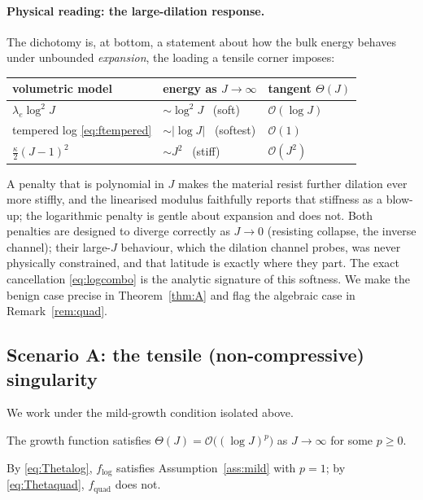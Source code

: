 \paragraph{Physical reading: the large-dilation response.}
The dichotomy is, at bottom, a statement about how the bulk energy behaves under unbounded \emph{expansion}, the
loading a tensile corner imposes:
\begin{center}
    \begin{tabular}{lll}
        \toprule
        volumetric model           & energy as $J\to\infty$   & tangent $\Theta(J)$   \\
        \midrule
        $\lambda_e\log^2 J$        & $\sim \log^2 J$ \ (soft) & $\mathcal{O}(\log J)$ \\
        tempered log \eqref{eq:ftempered} & $\sim |\log J|$ \ (softest) & $\mathcal{O}(1)$ \\
        $\tfrac{\kappa}{2}(J-1)^2$ & $\sim J^2$ \ (stiff)     & $\mathcal{O}(J^2)$    \\
        \bottomrule
    \end{tabular}
\end{center}
A penalty that is polynomial in $J$ makes the material resist further dilation ever more stiffly, and the linearised
modulus faithfully reports that stiffness as a blow-up; the logarithmic penalty is gentle about expansion and does not.
Both penalties are designed to diverge correctly as $J\to0$ (resisting collapse, the inverse channel); their
large-$J$ behaviour, which the dilation channel probes, was never physically constrained, and that latitude is exactly
where they part. The exact cancellation \eqref{eq:logcombo} is the analytic signature of this softness. We make the
benign case precise in Theorem~\ref{thm:A} and flag the algebraic case in Remark~\ref{rem:quad}.

\subsection{Scenario A: the tensile (non-compressive) singularity}
\label{sub:scenarioA}

We work under the mild-growth condition isolated above.

\begin{assumption}
    \label{ass:mild}
    The growth function satisfies $\Theta(J) = \mathcal{O}\!\big((\log J)^{p}\big)$ as $J\to\infty$ for some $p\ge 0$.
\end{assumption}

\noindent By \eqref{eq:Thetalog}, $f_{\log}$ satisfies Assumption~\ref{ass:mild} with $p=1$; by \eqref{eq:Thetaquad},
$f_{\mathrm{quad}}$ does not.

